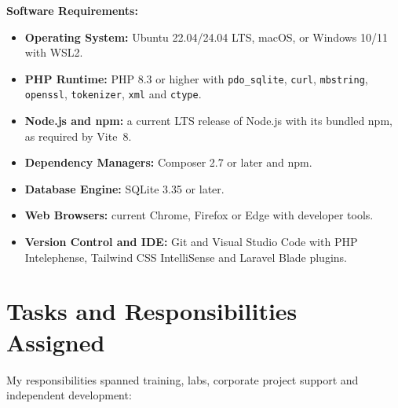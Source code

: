 \documentclass[12pt,a4paper]{report}
\newcommand{\VITE}{Vite~8}
\begin{document}
\textbf{Software Requirements:}
\begin{itemize}[leftmargin=*]
    \item \textbf{Operating System:} Ubuntu 22.04/24.04 LTS, macOS, or Windows 10/11 with WSL2.
    \item \textbf{PHP Runtime:} PHP 8.3 or higher with \texttt{pdo\_sqlite}, \texttt{curl}, \texttt{mbstring}, \texttt{openssl}, \texttt{tokenizer}, \texttt{xml} and \texttt{ctype}.
    \item \textbf{Node.js and npm:} a current LTS release of Node.js with its bundled npm, as required by \VITE{}.
    \item \textbf{Dependency Managers:} Composer 2.7 or later and npm.
    \item \textbf{Database Engine:} SQLite 3.35 or later.
    \item \textbf{Web Browsers:} current Chrome, Firefox or Edge with developer tools.
    \item \textbf{Version Control and IDE:} Git and Visual Studio Code with PHP Intelephense, Tailwind CSS IntelliSense and Laravel Blade plugins.
\end{itemize}


\section{Tasks and Responsibilities Assigned}\label{s34}

My responsibilities spanned training, labs, corporate project support and independent development:
\end{document}
